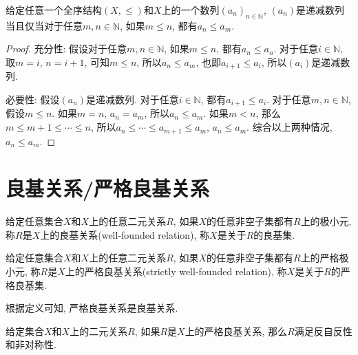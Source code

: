 \begin{proposition}
	给定任意一个全序结构$(X,\leq)$和$X$上的一个数列$(a_n)_{n\in \mathbb N}$, $(a_n)$是递减数列当且仅当对于任意$m,n\in \mathbb N$, 如果$m\leqslant n$, 都有$a_n\leq a_m$.
\end{proposition}

\begin{proof}
	充分性: 假设对于任意$m,n\in \mathbb N$, 如果$m\leqslant n$, 都有$a_n\leq a_n$. 对于任意$i\in \mathbb N$, 取$m=i$, $n=i+1$, 可知$m\leq n$, 所以$a_n\leqslant a_m$, 也即$a_{i+1}\leq a_i$, 所以$(a_i)$是递减数列.
	
	必要性: 假设$(a_n)$是递减数列. 对于任意$i\in \mathbb N$, 都有$a_{i+1}\leq a_i$. 对于任意$m,n\in \mathbb N$, 假设$m\leqslant n$. 如果$m=n$, $a_n=a_m$, 所以$a_n\leq a_m$. 如果$m<n$, 那么$m\leqslant m+1\leqslant \cdots\leqslant n$, 所以$a_n\leq \cdots \leq a_{m+1}\leq a_m$, $a_n\leq a_m$. 综合以上两种情况, $a_n\leq a_m$.
\end{proof}

\section{良基关系/严格良基关系}
\begin{definition}
	给定任意集合$X$和$X$上的任意二元关系$R$, 如果$X$的任意非空子集都有$R$上的极小元, 称$R$是$X$上的良基关系(well-founded relation), 称$X$是关于$R$的良基集.
\end{definition}

\begin{definition}
	给定任意集合$X$和$X$上的任意二元关系$R$, 如果$X$的任意非空子集都有$R$上的严格极小元, 称$R$是$X$上的严格良基关系(strictly well-founded relation), 称$X$是关于$R$的严格良基集.
\end{definition}

根据定义可知, 严格良基关系是良基关系.

\begin{proposition}
	给定集合$X$和$X$上的二元关系$R$, 如果$R$是$X$上的严格良基关系, 那么$R$满足反自反性和非对称性.
\end{proposition}

